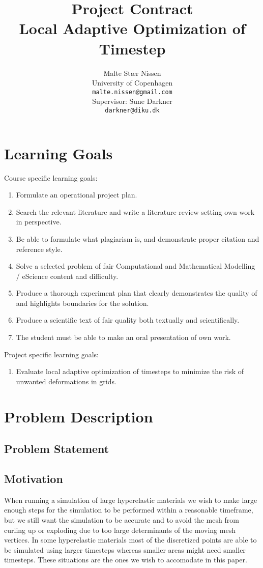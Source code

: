 \documentclass[11pt,a4paper]{article}
\title{Project Contract\\Local Adaptive Optimization of Timestep}
\author{Malte Stær Nissen\\University of Copenhagen\\\texttt{malte.nissen@gmail.com}\\Supervisor: Sune Darkner\\\texttt{darkner@diku.dk}}
\begin{document}
\maketitle

\section{Learning Goals}
Course specific learning goals:
\begin{enumerate}
	\item Formulate an operational project plan.
	\item Search the relevant literature and write a literature review setting own work in perspective.
	\item Be able to formulate what plagiarism is, and demonstrate proper citation and reference style.
	\item Solve a selected problem of fair Computational and Mathematical Modelling / eScience content and difficulty.
	\item Produce a thorough experiment plan that clearly demonstrates the quality of and highlights boundaries for the solution. 
	\item Produce a scientific text of fair quality both textually and scientifically.
	\item The student must be able to make an oral presentation of own work.
\end{enumerate}
Project specific learning goals:
\begin{enumerate}
	\item Evaluate local adaptive optimization of timesteps to minimize the risk of unwanted deformations in grids.
\end{enumerate}

\section{Problem Description}

\subsection{Problem Statement}

\subsection{Motivation}
When running a simulation of large hyperelastic materials we wish to make
large enough steps for the simulation to be performed within a reasonable
timeframe, but we still want the simulation to be accurate and to avoid
the mesh from curling up or exploding due to too large determinants of the
moving mesh vertices. In some hyperelastic materials most of the
discretized points are able to be simulated using larger timesteps whereas
smaller areas might need smaller timesteps. These situations are the ones
we wish to accomodate in this paper.
\end{document}
